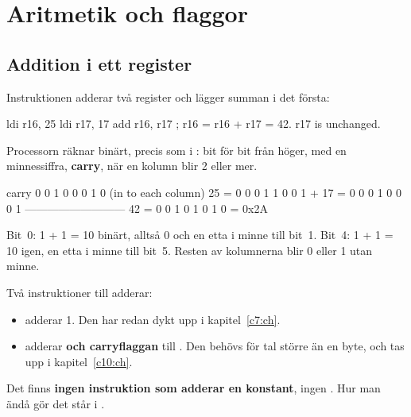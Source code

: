 %

\section{Aritmetik och flaggor}
\label{c8:app:a}

\subsection{Addition i ett register}
\label{c8:a1}
Instruktionen  adderar två register och lägger summan i det första:

\begin{asmcode}
    ldi r16, 25
    ldi r17, 17
    add r16, r17                    ; r16 = r16 + r17 = 42. r17 is unchanged.
\end{asmcode}

\noindent Processorn räknar binärt, precis som i : bit för bit från höger, med en
minnessiffra, \textbf{carry}, när en kolumn blir 2 eller mer.

\begin{textdrawing}
   carry     0 0 1 0 0 0 1 0  (in to each column)
   25    =   0 0 0 1 1 0 0 1
 + 17    =   0 0 0 1 0 0 0 1
   ---------------------------
   42    =   0 0 1 0 1 0 1 0  =  0x2A
\end{textdrawing}

\noindent Bit~0: 1 + 1 = 10 binärt, alltså 0 och en etta i minne till bit~1. Bit~4: 1 + 1 = 10
igen, en etta i minne till bit~5. Resten av kolumnerna blir 0 eller 1 utan minne.

Två instruktioner till adderar:
\begin{itemize}
  \item \textbf{} adderar 1. Den har redan dykt upp i kapitel~\ref{c7:ch}.
  \item \textbf{} adderar  \textbf{och carryflaggan} till .
    Den behövs för tal större än en byte, och tas upp i kapitel~\ref{c10:ch}.
\end{itemize}

Det finns \textbf{ingen instruktion som adderar en konstant}, ingen . Hur man ändå gör
det står i .

